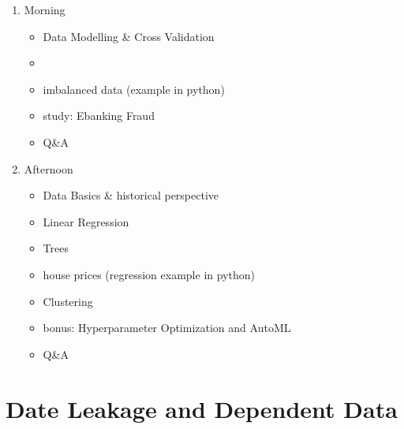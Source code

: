 \documentclass[letterpaper,10pt,english]{jupyterBook}
\begin{document}
\noindent{}
\begin{enumerate}
%
\item {} 
\sphinxAtStartPar
Morning
\begin{itemize}
\item {} 
\sphinxAtStartPar
Data Modelling \& Cross Validation

\item {} 
\sphinxAtStartPar
{}

\item {} 
\sphinxAtStartPar
imbalanced data (example in python)

\item {} 
\sphinxAtStartPar
study: Ebanking Fraud

\item {} 
\sphinxAtStartPar
Q\&A

\end{itemize}



\item {} 
\sphinxAtStartPar
Afternoon
\begin{itemize}
\item {} 
\sphinxAtStartPar
Data Basics \& historical perspective

\item {} 
\sphinxAtStartPar
Linear Regression

\item {} 
\sphinxAtStartPar
Trees

\item {} 
\sphinxAtStartPar
house prices (regression example in python)

\item {} 
\sphinxAtStartPar
Clustering

\item {} 
\sphinxAtStartPar
bonus: Hyperparameter Optimization and AutoML

\item {} 
\sphinxAtStartPar
Q\&A

\end{itemize}

\end{enumerate}


\chapter{Date Leakage and Dependent Data}
\label{\detokenize{dependent_data:date-leakage-and-dependent-data}}
\noindent{}
\end{document}

